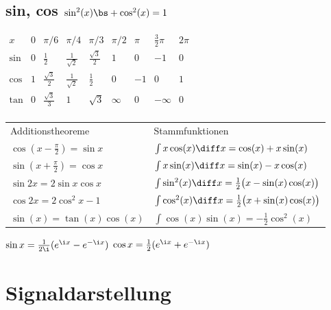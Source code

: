 \documentclass[6pt,a4paper]{scrartcl}
\begin{document}
\begin{multicols}{4}
		\subsection{sin, cos \quad $\sin^2(x) \bs + \cos^2(x) = 1$}
			$\begin{array}{c|c|c|c|c|c|c|c|c}
				x & 0 & \pi / 6 & \pi / 4 & \pi / 3 & \pi / 2 & \pi & \frac{3}{2}\pi & 2 \pi \\ \hline
				\sin & 0 & \frac{1}{2} & \frac{1}{\sqrt{2}} & \frac{\sqrt 3}{2} & 1 & 0 & -1 & 0 \\
				\cos & 1 & \frac{\sqrt 3}{2} & \frac{1}{\sqrt 2} & \frac{1}{2} & 0 & -1 & 0 & 1 \\     
				\tan & 0 & \frac{\sqrt{3}}{3}&	1				 &	\sqrt{3} & \infty & 0 & - \infty & 0\\
			\end{array}$ 
			\begin{tabular}{l  l} 
				Additionstheoreme &  Stammfunktionen\\
		 		$\cos (x - \frac{\pi}{2}) = \sin x$ & $\int x \cos(x) \diff x = \cos(x) + x \sin(x)$\\
				$\sin (x + \frac{\pi}{2}) = \cos x$ & $\int x \sin(x) \diff x = \sin(x) - x \cos(x)$\\
			 	$\sin 2x = 2 \sin x \cos x $  & $\int \sin^2(x) \diff x = \frac12 \bigl(x - \sin(x)\cos(x) \bigr)$\\
			 	$\cos 2x = 2\cos^2 x - 1$  & $\int \cos^2(x) \diff x = \frac12 \bigl(x + \sin(x)\cos(x) \bigr)$\\
		 		$\sin(x) = \tan(x)\cos(x)$ & $\int \cos(x)\sin(x) = -\frac12 \cos^2(x)$ \\
			\end{tabular}

			$\sin x = \frac{1}{2\i} ( e^{\i x} - e^{- \i x})$ \qquad $\cos x = \frac{1}{2}( e^{\i x} + e^{- \i x})$
	
	\section{Signaldarstellung}

\end{multicols}
\end{document}
